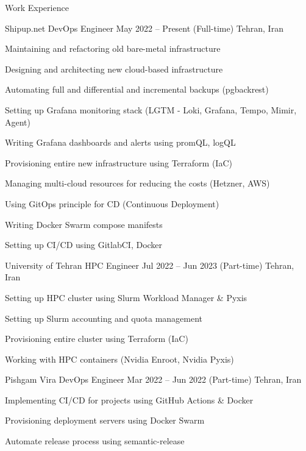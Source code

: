 \documentclass[]{main}
\begin{document}
\begin{section}{Work Experience}
    \begin{subsection}{ Shipup.net }{ DevOps Engineer }{ May 2022 -- Present (Full-time) }{ Tehran, Iran }
            \item Maintaining and refactoring old bare-metal infrastructure 
            \item Designing and architecting new cloud-based infrastructure 
            \item Automating full and differential and incremental backups (pgbackrest) 
            \item Setting up Grafana monitoring stack (LGTM - Loki, Grafana, Tempo, Mimir, Agent) 
            \item Writing Grafana dashboards and alerts using promQL, logQL 
            \item Provisioning entire new infrastructure using Terraform (IaC) 
            \item Managing multi-cloud resources for reducing the costs (Hetzner, AWS) 
            \item Using GitOps principle for CD (Continuous Deployment) 
            \item Writing Docker Swarm compose manifests 
            \item Setting up CI/CD using GitlabCI, Docker 
            \end{subsection}
    \begin{subsection}{ University of Tehran }{ HPC Engineer }{ Jul 2022 -- Jun 2023 (Part-time) }{ Tehran, Iran }
            \item Setting up HPC cluster using Slurm Workload Manager \& Pyxis 
            \item Setting up Slurm accounting and quota management 
            \item Provisioning entire cluster using Terraform (IaC) 
            \item Working with HPC containers (Nvidia Enroot, Nvidia Pyxis) 
            \end{subsection}
    \begin{subsection}{ Pishgam Vira }{ DevOps Engineer }{ Mar 2022 -- Jun 2022 (Part-time) }{ Tehran, Iran }
            \item Implementing CI/CD for projects using GitHub Actions \& Docker 
            \item Provisioning deployment servers using Docker Swarm 
            \item Automate release process using semantic-release 

\end{subsection}
\end{section}
\end{document}

